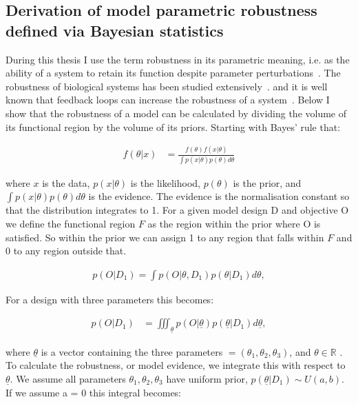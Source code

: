 \subsection{Derivation of model parametric robustness defined via Bayesian statistics}
\label{sec:rob_back}
During this thesis I use the term robustness in its parametric meaning, i.e. as the ability of a system to retain its function despite parameter perturbations~\autocite{Stelling:2004wo}. The robustness of biological systems has been studied extensively~\autocite{Barkai:1997cd, Stelling:2004wo, Prill:2005fq, Kim:2006uk, Kitano:2007cp, Hafner:2009ct, Shinar:2010dd, ZamoraSillero:2011jw, Woods:2016eh}. and it is well known that feedback loops can increase the robustness of a system~\autocite{Becskei:2000ft,	 DOYLE:2005ul}. Below I show that the robustness of a model can be calculated by dividing the volume of its functional region by the volume of its priors. Starting with Bayes' rule that:

\begin{align}
	f(\theta|x) &= \frac{f(\theta)f(x|\theta)}{\int p(x|\theta)p(\theta)d\theta}
\end{align}

\noindent where $x$ is the data, $p(x|\theta)$ is the likelihood, $p(\theta)$ is the prior, and $\displaystyle \int p(x|\theta)p(\theta)d\theta$ is the evidence. The evidence is the normalisation constant so that the distribution integrates to 1. For a given model design D and objective O we define the functional region $F$ as the region within the prior where O is satisfied. So within the prior we can assign 1 to any region that falls within $F$ and 0 to any region outside that. 

\begin{align}
p(O|D_1) = \int p(O|\theta,D_1)p(\theta|D_1)d\theta,
\end{align}

\noindent For a design with three parameters this becomes:

\begin{align}
p(O|D_1) &= \displaystyle \iiint_{\underline{\theta}} p(O|\underline{\theta})p(\underline{\theta}|D_1)d\underline{\theta},
\end{align}

\noindent where $\underline{\theta}$ is a vector containing the three parameters $ = (\theta_1, \theta_2,\theta_3)$, and $\theta \in \mathbb{R} $ . To calculate the robustness, or model evidence, we integrate this with respect to $\underline{\theta}$. We assume  all parameters $\theta_1, \theta_2,\theta_3$ have uniform prior, $p(\underline{\theta}|D_1) \sim U(a, b)$. If we assume a = 0 this integral becomes:

